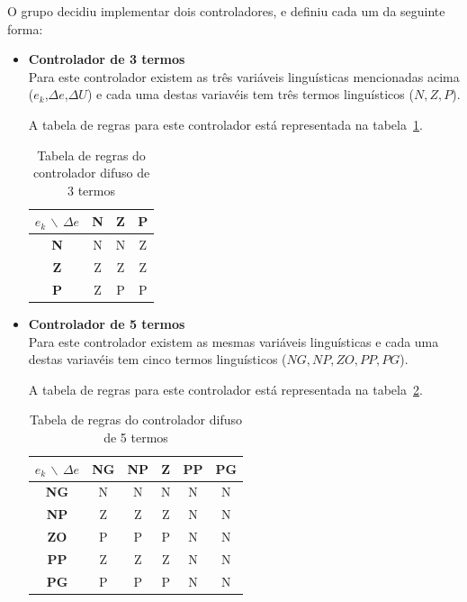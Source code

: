 \documentclass{article}
\begin{document}
O grupo decidiu implementar dois controladores, e definiu cada um da seguinte forma:
\begin{itemize}
\item \textbf{Controlador de 3 termos} \\
Para este controlador existem as três variáveis linguísticas mencionadas acima ($e_{k}$,$\Delta e$,$\Delta U$) e cada uma destas variavéis tem três termos linguísticos (${N,Z,P}$).

A tabela de regras para este controlador está representada na tabela~\ref{3_terms_fuzzy}.

\begin{table}[!h]
\centering
	\caption{Tabela de regras do controlador difuso de 3 termos}
	\label{3_terms_fuzzy}
	\begin{tabular}{|c|c|c|c|}
	\hline 
	$e_{k}$ $\backslash$ $\Delta e$ & \textbf{N} & \textbf{Z} & \textbf{P} \\ 
	\hline 
	\textbf{N} & N  & N & Z \\ 
	\hline 
	\textbf{Z} & Z & Z & Z \\ 
	\hline 
	\textbf{P} & Z & P & P \\ 
	\hline 
	\end{tabular} 
\end{table}


\item \textbf{Controlador de 5 termos} \\
Para este controlador existem as mesmas variáveis linguísticas e cada uma destas variavéis tem cinco termos linguísticos (${NG,NP,ZO,PP,PG}$).

A tabela de regras para este controlador está representada na tabela~\ref{5_terms_fuzzy}.

\begin{table}[!h]
\centering
	\caption{Tabela de regras do controlador difuso de 5 termos}
	\label{5_terms_fuzzy}
	\begin{tabular}{|c|c|c|c|c|c|}
	\hline 
	$e_{k}$ $\backslash$ $\Delta e$ & \textbf{NG} & \textbf{NP} & \textbf{Z} & \textbf{PP} & \textbf{PG} \\ 
	\hline 
	\textbf{NG} & N  & N & N & N & N\\ 
	\hline 
	\textbf{NP} & Z & Z & Z & N & N\\ 
	\hline 
	\textbf{ZO} & P & P & P & N & N\\ 
	\hline
	\textbf{PP} & Z & Z & Z & N & N\\ 
	\hline 
	\textbf{PG} & P & P & P & N & N\\ 
	\hline 
	\end{tabular} 
\end{table}
\end{itemize}
\end{document}
